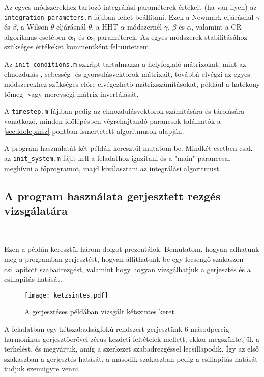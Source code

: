 Az egyes módszerekhez tartozó integrálási paraméterek értékeit (ha van ilyen) az \verb|integration_parameters.m| fájlban lehet beállítani. Ezek a  Newmark eljárásnál  $\gamma$ és $\beta$, a Wilson-$\theta$ eljárásnál $\theta$, a HHT-$\alpha$ módszernél $\gamma$, $\beta$ és $\alpha$, valamint a CR algoritmus esetében $\boldsymbol\alpha_1$ és $\boldsymbol\alpha_2$ paraméterek. Az egyes módszerek stabilitásához szükséges értékeket kommentként feltüntettem.
 
Az \verb|init_conditions.m| szkript tartalmazza a helyfoglaló mátrixokat, mint az elmozdulás-, sebesség- és gyorsulásvektorok mátrixait, továbbá elvégzi az egyes módszerekhez szükséges előre elvégezhető mátrixszámításokat, például a hatékony tömeg- vagy merevségi mátrix invertálását. 

 A \verb|timestep.m| fájlban pedig  az elmozdulásvektorok számítására  és tárolására vonatkozó, minden időlépésben végrehajtandó parancsok találhatók a \ref{sec:idolepmsz} pontban ismertetett algoritmusok alapján.
 
A program használatát két példán keresztül mutatom be. Mindkét esetben csak az \verb|init_system.m| fájlt kell a feladathoz igazítani és a "main" paranccsal meghívni a főprogramot, majd kiválasztani az integrálási algoritmust. 


\subsection{A program használata gerjesztett rezgés vizsgálatára}\label{subsec:lingerj}

{\ }

Ezen a példán keresztül három dolgot prezentálok. Bemutatom, hogyan adhatunk meg a programban  gerjesztést, hogyan állíthatunk be egy lecsengő szakaszon csillapított szabadrezgést, valamint hogy hogyan vizsgálhatjuk a gerjesztés és a csillapítás hatását. 

\begin{figure}[h!]
\centering
\texttt{[image: ketzsintes.pdf]}
\caption{A gerjesztéses példában vizsgált kétszintes keret.}
\label{fig:ketszabfok}
\end{figure}

A feladatban egy kétszabadságfokú rendszert gerjesztünk 6 másodpercig harmonikus gerjesztőerővel zérus kezdeti feltételek mellett, ekkor megszüntetjük a terhelést, és megvárjuk, amíg a szerkezet szabadrezgéssel lecsillapodik. Így az első szakaszban a  gerjesztés hatását, a második szakaszban pedig a csillapítás hatását tudjuk szemügyre venni. 


